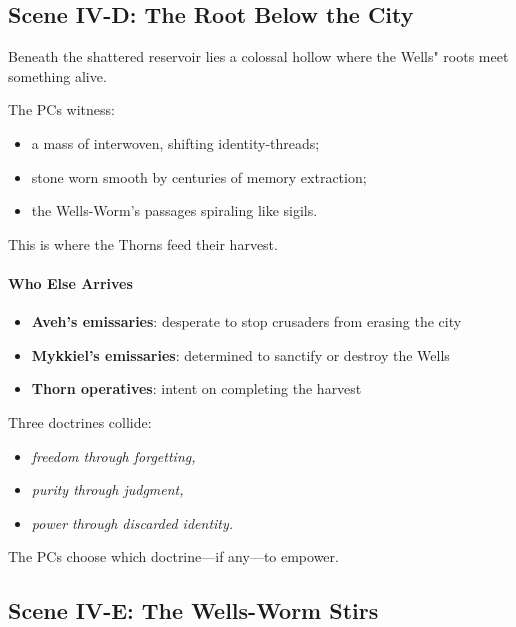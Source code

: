 \documentclass[11pt]{book}
\begin{document}
\subsection*{Scene IV-D: The Root Below the City}

Beneath the shattered reservoir lies a colossal hollow where the Wells"
roots meet something alive.

The PCs witness:
\begin{itemize}[leftmargin=*]
    \item a mass of interwoven, shifting identity-threads;
    \item stone worn smooth by centuries of memory extraction;
    \item the Wells-Worm's passages spiraling like sigils.
\end{itemize}

This is where the Thorns feed their harvest.

\paragraph{Who Else Arrives}
\begin{itemize}
    \item \textbf{Aveh's emissaries}: desperate to stop crusaders from erasing the city
    \item \textbf{Mykkiel's emissaries}: determined to sanctify or destroy the Wells
    \item \textbf{Thorn operatives}: intent on completing the harvest
\end{itemize}

Three doctrines collide:
\begin{itemize}
    \item \emph{freedom through forgetting,}
    \item \emph{purity through judgment,}
    \item \emph{power through discarded identity.}
\end{itemize}

The PCs choose which doctrine---if any---to empower.

\subsection*{Scene IV-E: The Wells-Worm Stirs}
\end{document}
